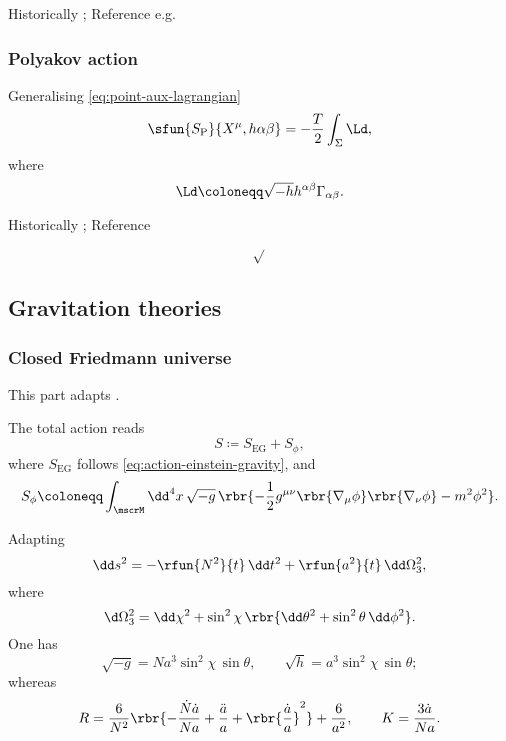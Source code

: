 \documentclass[a4paper,11pt]{article}
\begin{document}
Historically \cite{Nambu1970,Goto1971}; Reference e.g.\ 
\cite{Blumenhagen2013}
\cite[sec.\ 3.2]{Kiefer2012}

\subsubsection*{Polyakov action}

Generalising \eqref{eq:point-aux-lagrangian}
\begin{equation}
\sfun{S_\text{P}}{X^\mu, h{\alpha\beta}} = -\frac{T}{2}\int_\Sigma \Ld,
\end{equation}
where
\begin{equation}
\Ld \coloneqq \sqrt{-h} h^{\alpha\beta}\Gamma_{\alpha\beta}.
\end{equation}



Historically \cite{Brink1976,Deser1976,Polyakov1981};
Reference
\cite[sec.\ 3.2]{Kiefer2012}


\begin{equation}
\sqrt{}
\end{equation}



\subsection{Gravitation theories}

\subsubsection*{Closed Friedmann universe}
This part adapts \cite[sec.\ 8.1.2]{Kiefer2012}.

The total action reads
\begin{equation}
S \coloneqq S_\text{EG} + S_\phi,
\end{equation}
where $S_\text{EG}$ follows \eqref{eq:action-einstein-gravity}, and
\begin{equation}
S_\phi \coloneqq \int_\mscrM\dd^4 x\, \sqrt{-g}\,
\rbr{-\frac{1}{2} g^{\mu\nu} \rbr{\nabla_\mu\phi} \rbr{\nabla_\nu\phi}
-m^2\phi^2}.
\end{equation}

Adapting
\begin{equation}
\dd s^2 = -\rfun{N^2}{t}\,\dd t^2 + \rfun{a^2}{t}\,\dd\Omega_3^2,
\end{equation}
where
\begin{equation}
\d\Omega_3^2 = \dd\chi^2+\sin^2\chi\,\rbr{\dd\theta^2+\sin^2\theta\,\dd\phi^2}.
\end{equation}
One has
\begin{equation}
\sqrt{-g} = N a^3 \sin^2\chi\,\sin\theta,\qquad
\sqrt{h} = a^3\sin^2\chi\,\sin\theta;
\end{equation}
whereas
\begin{equation}
R = \frac{6}{N^2}\rbr{-\frac{\dot{N}\dot{a}}{Na} + \frac{\ddot{a}}{a} + 
\rbr{\frac{\dot{a}}{a}}^2} + \frac{6}{a^2},\qquad
K = \frac{3\dot{a}}{Na}.
\end{equation}
\end{document}
